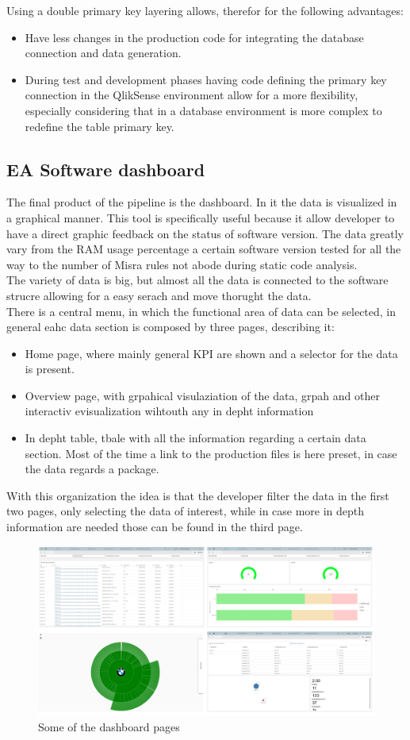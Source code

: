 \documentclass[../main.tex]{subfiles}
\begin{document}
Using a double primary key layering allows, therefor for the following advantages:
\begin{itemize}
\item Have less changes in the production code for integrating the database connection and data generation.
\item During test and development phases having code defining the primary key connection in the QlikSense environment allow for a more flexibility, especially considering that in a database environment is more complex to redefine the table primary key. 
\end{itemize}
\subsection{EA Software dashboard}
The final product of the pipeline is the dashboard. In it the data is visualized in a graphical manner. This tool is specifically useful because it allow developer to have a direct graphic feedback on the status of software version. The data greatly vary from the RAM usage percentage a certain software version tested for all the way to the number of Misra rules not abode during static code analysis.\\
The variety of data is big, but almost all the data is connected to the software strucre allowing for a easy serach and move thorught the data.\\
There is a central menu, in which the functional area of data can be selected, in general eahc data section is composed by three pages, describing it:
\begin{itemize}
    \item Home page, where mainly general \gls{KPI} are shown and a selector for the data is present.
    \item Overview page, with grpahical visulaziation of the data, grpah and other interactiv evisualization wihtouth any in depht information
    \item In depht table, tbale with all the information regarding a certain data section. Most of the time a link to the production files is here preset, in case the data regards a package. 
\end{itemize}
With this organization the idea is that the developer filter the data in the first two pages, only selecting the data of interest, while in case more in depth information are needed those can be found in the third page.  
\begin{figure}[H]
    \centering
    \includegraphics[width=\linewidth]{images_folder/dashboard.png}
    \caption{Some of the dashboard pages}
    \label{fig:dashboardseite}
\end{figure}
\cleardoublepage
\end{document}
